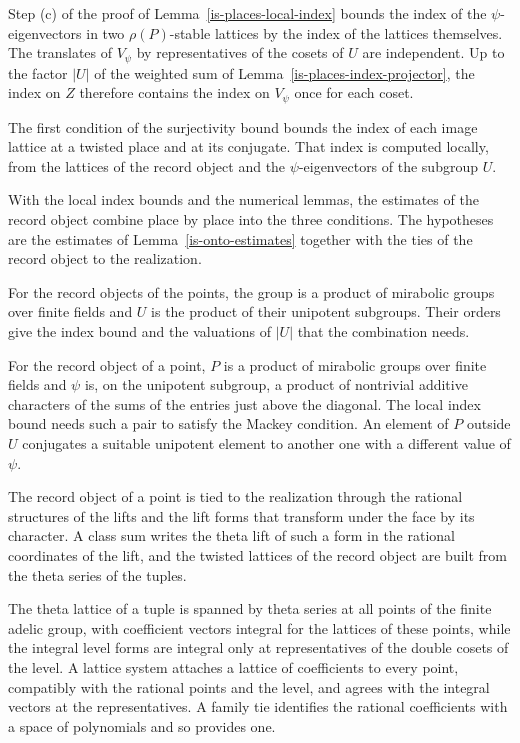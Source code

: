 Step (c) of the proof of Lemma~\ref{is-places-local-index} bounds the index of the
$\psi$-eigenvectors in two $\rho(P)$-stable lattices by the index of the lattices themselves. The
translates of $V_\psi$ by representatives of the cosets of $U$ are independent. Up to the factor
$|U|$ of the weighted sum of Lemma~\ref{is-places-index-projector}, the index on $Z$ therefore
contains the index on $V_\psi$ once for each coset.

The first condition of the surjectivity bound bounds the index of each image lattice at a twisted
place and at its conjugate. That index is computed locally, from the lattices of the record object
and the $\psi$-eigenvectors of the subgroup $U$.

With the local index bounds and the numerical lemmas, the estimates of the record object combine
place by place into the three conditions. The hypotheses are the estimates of
Lemma~\ref{is-onto-estimates} together with the ties of the record object to the realization.

For the record objects of the points, the group is a product of mirabolic groups over finite fields
and $U$ is the product of their unipotent subgroups. Their orders give the index bound and the
valuations of $|U|$ that the combination needs.

For the record object of a point, $P$ is a product of mirabolic groups over finite fields and $\psi$
is, on the unipotent subgroup, a product of nontrivial additive characters of the sums of the entries
just above the diagonal. The local index bound needs such a pair to satisfy the Mackey condition. An
element of $P$ outside $U$ conjugates a suitable unipotent element to another one with a different
value of $\psi$.

The record object of a point is tied to the realization through the rational structures of the lifts
and the lift forms that transform under the face by its character. A class sum writes the theta lift
of such a form in the rational coordinates of the lift, and the twisted lattices of the record object
are built from the theta series of the tuples.

The theta lattice of a tuple is spanned by theta series at all points of the finite adelic group,
with coefficient vectors integral for the lattices of these points, while the integral level forms
are integral only at representatives of the double cosets of the level. A lattice system attaches a
lattice of coefficients to every point, compatibly with the rational points and the level, and agrees
with the integral vectors at the representatives. A family tie identifies the rational coefficients
with a space of polynomials and so provides one.


